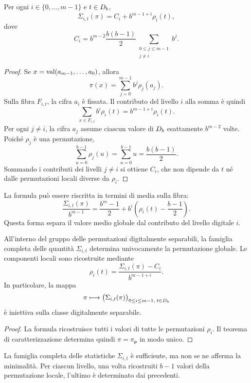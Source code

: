 	\begin{theorem}\label{thm:statistiche-fibra}
		Per ogni \(i\in\{0,\dots,m-1\}\) e \(t\in D_b\),
		\[
		\Sigma_{i,t}(\pi)
		=
		C_i+b^{m-1+i}\rho_i(t),
		\]
		dove
		\[
		C_i
		=
		b^{m-2}\frac{b(b-1)}2
		\sum_{\substack{0\le j\le m-1\\j\ne i}}b^j.
		\]
	\end{theorem}

	\begin{proof}
		Se \(x=\operatorname{val}(a_{m-1},\dots,a_0)\), allora
		\[
		\pi(x)
		=
		\sum_{j=0}^{m-1}b^j\rho_j(a_j).
		\]
		Sulla fibra \(F_{i,t}\), la cifra \(a_i\) è fissata. Il contributo del
		livello \(i\) alla somma è quindi
		\[
		\sum_{x\in F_{i,t}}b^i\rho_i(t)
		=
		b^{m-1+i}\rho_i(t).
		\]
		Per ogni \(j\ne i\), la cifra \(a_j\) assume ciascun valore di \(D_b\)
		esattamente \(b^{m-2}\) volte. Poiché \(\rho_j\) è una permutazione,
		\[
		\sum_{u=0}^{b-1}\rho_j(u)
		=
		\sum_{u=0}^{b-1}u
		=
		\frac{b(b-1)}2.
		\]
		Sommando i contributi dei livelli \(j\ne i\) si ottiene \(C_i\), che non
		dipende da \(t\) né dalle permutazioni locali diverse da \(\rho_i\).
	\end{proof}

	La formula può essere riscritta in termini di media sulla fibra:
	\[
	\boxed{
	\frac{\Sigma_{i,t}(\pi)}{b^{m-1}}
	=
	\frac{b^m-1}{2}
	+b^i\left(\rho_i(t)-\frac{b-1}{2}\right).
	}
	\]
	Questa forma separa il valore medio globale dal contributo del livello
	digitale \(i\).

	\begin{corollary}
		All'interno del gruppo delle permutazioni digitalmente separabili, la
		famiglia completa delle quantità \(\Sigma_{i,t}\) determina univocamente la
		permutazione globale. Le componenti locali sono ricostruite mediante
		\[
		\rho_i(t)
		=
		\frac{\Sigma_{i,t}(\pi)-C_i}{b^{m-1+i}}.
		\]
		In particolare, la mappa
		\[
		\pi
		\longmapsto
		\bigl(\Sigma_{i,t}(\pi)\bigr)_{
			0\le i\le m-1,\;t\in D_b}
		\]
		è iniettiva sulla classe digitalmente separabile.
	\end{corollary}

	\begin{proof}
		La formula ricostruisce tutti i valori di tutte le permutazioni
		\(\rho_i\). Il teorema di caratterizzazione determina quindi
		\(\pi=\pi_{\boldsymbol{\rho}}\) in modo unico.
	\end{proof}

	\begin{remark}
		La famiglia completa delle statistiche \(\Sigma_{i,t}\) è sufficiente, ma
		non se ne afferma la minimalità. Per ciascun livello, una volta ricostruiti
		\(b-1\) valori della permutazione locale, l'ultimo è determinato dai
		precedenti.
	\end{remark}

